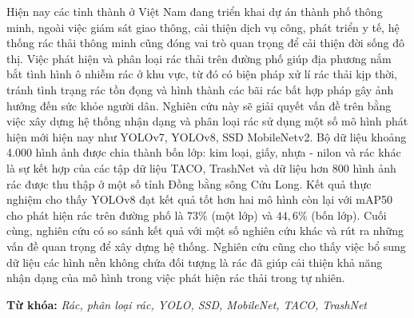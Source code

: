 \documentclass[./thesis.tex]{subfiles}
\begin{document}

{\fontsize{13}{12} \selectfont

Hiện nay các tỉnh thành ở Việt Nam đang triển khai dự án thành phố thông minh, ngoài việc giám sát giao thông, cải thiện dịch vụ công, phát triển y tế, hệ thống rác thải thông minh cũng đóng vai trò quan trọng để cải thiện đời sống đô thị.
Việc phát hiện và phân loại rác thải trên đường phố giúp địa phương nắm bắt tình hình ô nhiễm rác ở khu vực, từ đó có biện pháp xử lí rác thải kịp thời, tránh tình trạng rác tồn đọng và hình thành các bãi rác bất hợp pháp gây ảnh hưởng đến sức khỏe người dân.
Nghiên cứu này sẽ giải quyết vấn đề trên bằng việc xây dựng hệ thống nhận dạng và phân loại rác sử dụng một số mô hình phát hiện mới hiện nay như YOLOv7, YOLOv8, SSD MobileNetv2.
Bộ dữ liệu khoảng 4.000 hình ảnh được chia thành bốn lớp: kim loại, giấy, nhựa - nilon và rác khác là sự kết hợp của các tập dữ liệu TACO, TrashNet và dữ liệu hơn 800 hình ảnh rác được thu thập ở một số tỉnh Đồng bằng sông Cửu Long.
Kết quả thực nghiệm cho thấy YOLOv8 đạt kết quả tốt hơn hai mô hình còn lại với mAP50 cho phát hiện rác trên đường phố là $73\%$ (một lớp) và $44,6\%$ (bốn lớp).
Cuối cùng, nghiên cứu có so sánh kết quả với một số nghiên cứu khác và rút ra những vấn đề quan trọng để xây dựng hệ thống.
Nghiên cứu cũng cho thấy việc bổ sung dữ liệu các hình nền không chứa đối tượng là rác đã giúp cải thiện khả năng nhận dạng của mô hình trong việc phát hiện rác thải trong tự nhiên.

}
\bigskip

{\bf Từ khóa:} \textit{Rác, phân loại rác, YOLO, SSD, MobileNet, TACO, TrashNet}
\end{document}

